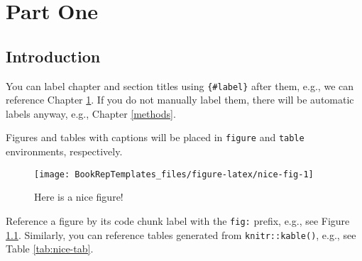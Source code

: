\documentclass[]{book}
\theoremstyle{definition}
\theoremstyle{definition}
\theoremstyle{definition}
\theoremstyle{remark}
\begin{document}
\part{Part One}\label{part-part-one}

\chapter{Introduction}\label{intro}

You can label chapter and section titles using \texttt{\{\#label\}}
after them, e.g., we can reference Chapter \ref{intro}. If you do not
manually label them, there will be automatic labels anyway, e.g.,
Chapter \ref{methods}.

Figures and tables with captions will be placed in \texttt{figure} and
\texttt{table} environments, respectively.

\begin{figure}

{\centering \texttt{[image: BookRepTemplates\_files/figure-latex/nice-fig-1]} 

}

\caption{Here is a nice figure!}\label{fig:nice-fig}
\end{figure}

Reference a figure by its code chunk label with the \texttt{fig:}
prefix, e.g., see Figure \ref{fig:nice-fig}. Similarly, you can
reference tables generated from \texttt{knitr::kable()}, e.g., see Table
\ref{tab:nice-tab}.
\end{document}
